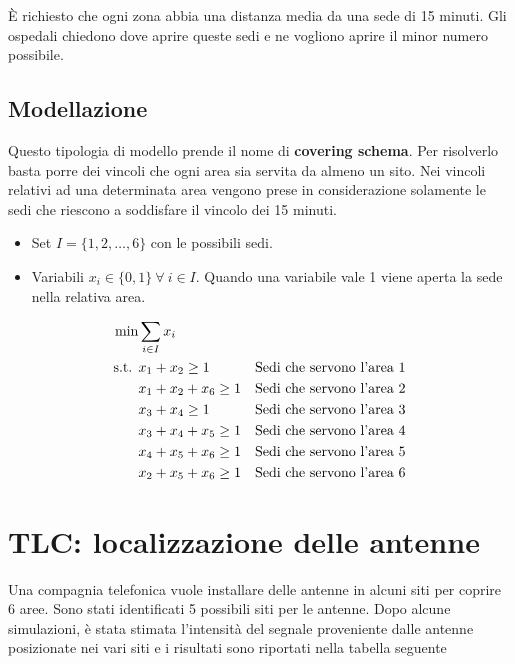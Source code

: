 \noindent \`E richiesto che ogni zona abbia una distanza media da una sede di 15 minuti. Gli ospedali chiedono dove aprire queste sedi e ne vogliono aprire il minor numero possibile.

\subsection{Modellazione}

Questo tipologia di modello prende il nome di \textbf{covering schema}. Per risolverlo basta porre dei vincoli che ogni area sia servita da almeno un sito. Nei vincoli relativi ad una determinata area vengono prese in considerazione solamente le sedi che riescono a soddisfare il vincolo dei 15 minuti.

\begin{itemize}
	\item Set $I = \{1,2, \ldots , 6 \}$ con le possibili sedi.
	\item Variabili $x_i \in \{0,1\} \: \forall\: i \in I$. Quando una variabile vale 1 viene aperta la sede nella relativa area.
\end{itemize}

\begin{align*}
\min &\sum\limits_{i \in I} x_i \\ 
\text{s.t. } &x_1 + x_2 \geq 1 &\text{Sedi che servono l'area 1} \\
	&x_1 + x_2 + x_6 \geq 1 &\text{Sedi che servono l'area 2} \\
	&x_3 + x_4 \geq 1 &\text{Sedi che servono l'area 3} \\
	&x_3 + x_4 + x_5 \geq 1 &\text{Sedi che servono l'area 4} \\
	&x_4 + x_5+x_6 \geq 1 &\text{Sedi che servono l'area 5} \\
	&x_2 + x_5 + x_6 \geq 1 &\text{Sedi che servono l'area 6} \\
\end{align*}

\section{TLC: localizzazione delle antenne}

Una compagnia telefonica vuole installare delle antenne in alcuni siti per coprire 6 aree. Sono stati identificati 5 possibili siti per le antenne. Dopo alcune simulazioni, è stata stimata l'intensità del segnale proveniente dalle antenne posizionate nei vari siti e i risultati sono riportati nella tabella seguente

